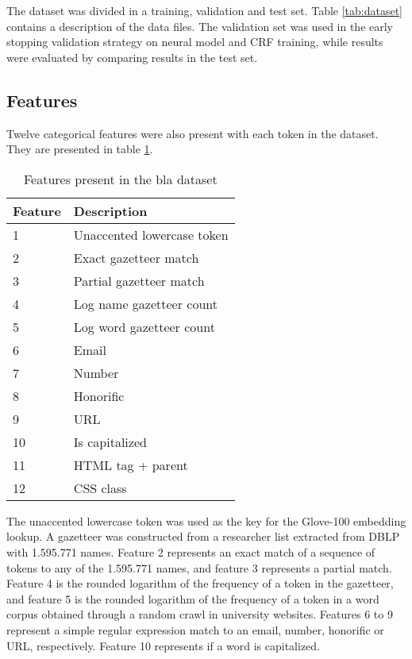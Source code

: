 \documentclass[sigconf]{acmart}
\begin{document}
The dataset was divided in a training, validation and test set. Table \ref{tab:dataset} contains
a description of the data files. The validation set was used in the early stopping validation strategy
on neural model and CRF training, while results were evaluated by comparing results in the test set.

\subsection{Features}

Twelve categorical features were also present with each token in the dataset. They 
are presented in table \ref{tab:features}.

\begin{table}[h]
  \small
  \begin{center}
    \begin{tabular}{ |l|l| }
      \hline
      Feature & Description \\
      \hline
      1  & Unaccented lowercase token \\
      2  & Exact gazetteer match \\
      3  & Partial gazetteer match \\
      4  & Log name gazetteer count\\
      5  & Log word gazetteer count\\
      6  & Email \\
      7  & Number \\
      8  & Honorific \\
      9  & URL \\
      10 & Is capitalized \\
      11 & HTML tag + parent \\
      12 & CSS class \\
      \hline
    \end{tabular}
  \end{center}
  \caption{Features present in the bla dataset}
  \label{tab:features}
\end{table}

The unaccented lowercase token was used as the key for the Glove-100 embedding lookup.
A gazetteer was constructed from a researcher list extracted from DBLP with 1.595.771
names. Feature 2 represents an exact match of a sequence of tokens to any of the 1.595.771 
names, and feature 3 represents a partial match. Feature 4 is the rounded logarithm of 
the frequency of a token in the gazetteer, and feature 5 is the rounded logarithm of the frequency
of a token in a word corpus obtained through a random crawl in university websites.
Features 6 to 9 represent a simple regular expression match to an email, number, 
honorific or URL, respectively. Feature 10 represents if a word is capitalized.
\end{document}
